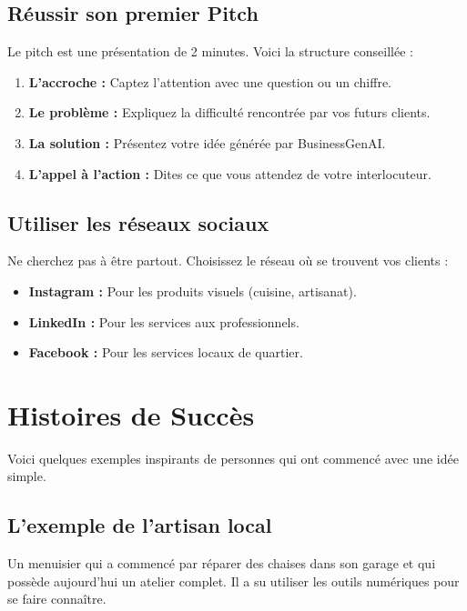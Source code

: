\documentclass[12pt,a4paper]{report}
\begin{document}
\section{Réussir son premier Pitch}
Le pitch est une présentation de 2 minutes. Voici la structure conseillée :
\begin{enumerate}
    \item \textbf{L'accroche :} Captez l'attention avec une question ou un chiffre.
    \item \textbf{Le problème :} Expliquez la difficulté rencontrée par vos futurs clients.
    \item \textbf{La solution :} Présentez votre idée générée par BusinessGenAI.
    \item \textbf{L'appel à l'action :} Dites ce que vous attendez de votre interlocuteur.
\end{enumerate}

\section{Utiliser les réseaux sociaux}
Ne cherchez pas à être partout. Choisissez le réseau où se trouvent vos clients :
\begin{itemize}
    \item \textbf{Instagram :} Pour les produits visuels (cuisine, artisanat).
    \item \textbf{LinkedIn :} Pour les services aux professionnels.
    \item \textbf{Facebook :} Pour les services locaux de quartier.
\end{itemize}

\newpage

\chapter{Histoires de Succès}
Voici quelques exemples inspirants de personnes qui ont commencé avec une idée simple.

\section{L'exemple de l'artisan local}
Un menuisier qui a commencé par réparer des chaises dans son garage et qui possède aujourd'hui un atelier complet. Il a su utiliser les outils numériques pour se faire connaître.
\end{document}
